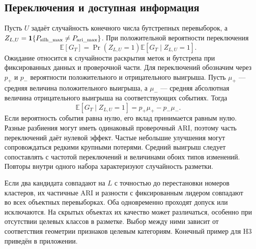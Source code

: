 \subsection{Переключения и доступная информация}
Пусть $U$ задаёт случайность конечного числа бутстрепных перевыборок, а $Z_{L,U}=\mathbf1\{P_{\mathrm{silh\_max}}\ne P_{\mathrm{ari\_max}}\}$. При положительной вероятности переключения
\begin{equation}\label{eq:switch-effect}
 \mathbb E[G_T]=\Pr(Z_{L,U}=1)\mathbb E[G_T\mid Z_{L,U}=1].
\end{equation}
Ожидание относится к случайности раскрытия меток и бутстрепа при фиксированных данных и проверочной части. Для переключений обозначим через $p_+$ и $p_-$ вероятности положительного и отрицательного выигрыша. Пусть $\mu_+$ --- средняя величина положительного выигрыша, а $\mu_-$ --- средняя абсолютная величина отрицательного выигрыша на соответствующих событиях. Тогда
\begin{equation}\label{eq:win-loss}
 \mathbb E[G_T\mid Z_{L,U}=1]=p_+\mu_+-p_-\mu_-.
\end{equation}
Если вероятность события равна нулю, его вклад принимается равным нулю. Разные разбиения могут иметь одинаковый проверочный ARI, поэтому часть переключений даёт нулевой эффект. Частые небольшие улучшения могут сопровождаться редкими крупными потерями. Средний выигрыш следует сопоставлять с частотой переключений и величинами обоих типов изменений. Повторы внутри одного набора характеризуют случайность разметки.

Если два кандидата совпадают на $L$ с точностью до перестановки номеров кластеров, их частичные ARI и разности с фиксированным лидером совпадают во всех объектных перевыборках. Оба одновременно проходят допуск или исключаются. На скрытых объектах их качество может различаться, особенно при отсутствии целевых классов в разметке. Выбор между ними зависит от соответствия геометрии признаков целевым категориям. Конечный пример для H3 приведён в приложении.

